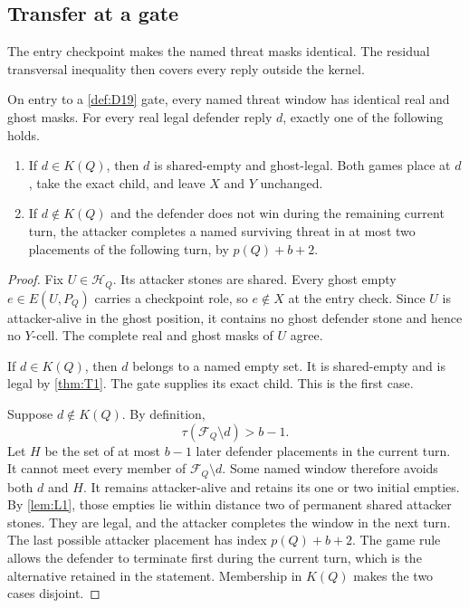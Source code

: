 \subsection{Transfer at a gate}

The entry checkpoint makes the named threat masks identical.  The residual
transversal inequality then covers every reply outside the kernel.

\begin{lemma}
\label{lem:L15}
On entry to a \cref{def:D19} gate, every named threat window has identical
real and ghost masks.  For every real legal defender reply $d$, exactly one
of the following holds.
\begin{enumerate}[label=\textup{(\arabic*)}]
  \item If $d\in K(Q)$, then $d$ is shared-empty and ghost-legal.  Both games
  place at $d$, take the exact child, and leave $X$ and $Y$ unchanged.
  \item If $d\notin K(Q)$ and the defender does not win during the remaining
  current turn, the attacker completes a named surviving threat in at most
  two placements of the following turn, by $p(Q)+b+2$.
\end{enumerate}
\end{lemma}

\begin{proof}
Fix $U\in\mathcal H_Q$.  Its attacker stones are shared.  Every ghost empty
$e\in E(U,P_Q)$ carries a checkpoint role, so $e\notin X$ at the entry
check.  Since $U$ is attacker-alive in the ghost position, it contains no
ghost defender stone and hence no $Y$-cell.  The complete real and ghost
masks of $U$ agree.

If $d\in K(Q)$, then $d$ belongs to a named empty set.  It is shared-empty and
is legal by \cref{thm:T1}.  The gate supplies its exact child.  This is the
first case.

Suppose $d\notin K(Q)$.  By definition,
\[
\tau(\mathcal F_Q\setminus d)>b-1.
\]
Let $H$ be the set of at most $b-1$ later defender placements in the current
turn.  It cannot meet every member of $\mathcal F_Q\setminus d$.  Some named
window therefore avoids both $d$ and $H$.  It remains attacker-alive and
retains its one or two initial empties.  By \cref{lem:L1}, those empties lie
within distance two of permanent shared attacker stones.  They are legal, and
the attacker completes the window in the next turn.  The last possible
attacker placement has index $p(Q)+b+2$.  The game rule allows the defender
to terminate first during the current turn, which is the alternative retained
in the statement.  Membership in $K(Q)$ makes the two cases disjoint.
\end{proof}

